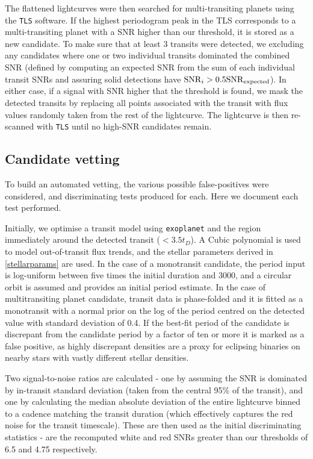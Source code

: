 \documentclass{article}
\begin{document}
The flattened lightcurves were then searched for multi-transiting planets using the \texttt{TLS} software.
If the highest periodogram peak in the TLS corresponds to a multi-transiting planet with a SNR higher than our threshold, it is stored as a new candidate.
To make sure that at least 3 transits were detected, we excluding any candidates where one or two individual transits dominated the combined SNR (defined by computing an expected SNR from the sum of each individual transit SNRs and assuring solid detections have ${\rm SNR}_i > 0.5 {\rm SNR}_{\rm expected}$).
In either case, if a signal with SNR higher that the threshold is found, we mask the detected transits by replacing all points associated with the transit with flux values randomly taken from the rest of the lightcurve.
The lightcurve is then re-scanned with \texttt{TLS} until no high-SNR candidates remain.

\subsection{Candidate vetting}
To build an automated vetting, the various possible false-positives were considered, and discriminating tests produced for each. Here we document each test performed.

Initially, we optimise a transit model using \texttt{exoplanet} and the region immediately around the detected transit ($<3.5t_D$). 
A Cubic polynomial is used to model out-of-transit flux trends, and the stellar parameters derived in \ref{stellarparams} are used.
In the case of a monotransit candidate, the period input is log-uniform between five times the initial duration and 3000, and a circular orbit is assumed and provides an initial period estimate.
In the case of multitransiting planet candidate, transit data is phase-folded and it is fitted as a monotransit with a normal prior on the log of the period centred on the detected value with standard deviation of 0.4. If the best-fit period of the candidate is discrepant from the candidate period by a factor of ten or more it is marked as a false positive, as highly discrepant densities are a proxy for eclipsing binaries on nearby stars with vastly different stellar densities.

Two signal-to-noise ratios are calculated - one by assuming the SNR is dominated by in-transit standard deviation (taken from the central 95\% of the transit), and one by calculating the median absolute deviation of the entire lightcurve binned to a cadence matching the transit duration (which effectively captures the red noise for the transit timescale).
These are then used as the initial discriminating statistics - are the recomputed white and red SNRs greater than our thresholds of 6.5 and 4.75 respectively.
\end{document}
